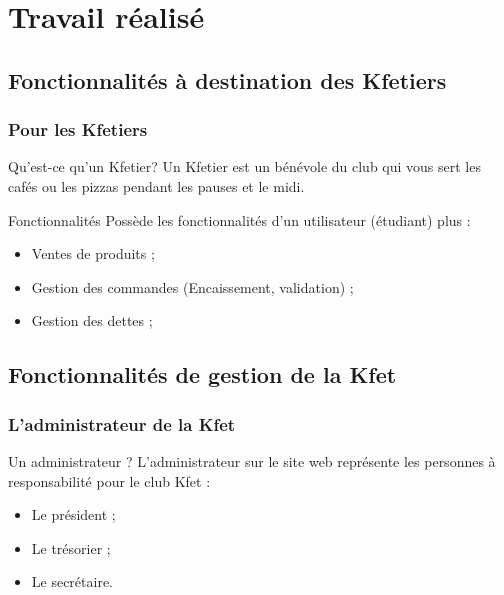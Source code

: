 \documentclass{polytech-presentation}
\newcommand{\beamerannot}[1]{
    \note{#1}
}
\begin{document}
        \section<presentation>{Travail réalisé}%

            \subsection<presentation>{Fonctionnalités à destination des Kfetiers}%
                \begin{frame}
		  \frametitle{Pour les Kfetiers}
		    \begin{block}{Qu'est-ce qu'un Kfetier?}
		     Un Kfetier est un bénévole du club qui vous sert les cafés ou les pizzas pendant les pauses et le
midi.
		    \end{block}

                    \begin{block}{Fonctionnalités}
                     Possède les fonctionnalités d'un utilisateur (étudiant) plus :
		      \begin{itemize}
		       \item Ventes de produits ;
		       \item Gestion des commandes (Encaissement, validation) ;
		       \item Gestion des dettes ;
		      \end{itemize}
                    \end{block}
                    \beamerannot{}
                \end{frame}

            \subsection<presentation>{Fonctionnalités de gestion de la Kfet}%
                \begin{frame}
		  \frametitle{L'administrateur de la Kfet}
                    \begin{block}{Un administrateur ?}
		      L'administrateur sur le site web représente les personnes à responsabilité pour le club Kfet :
		      \begin{itemize}
		       \item Le président ;
		       \item Le trésorier ;
		       \item Le secrétaire.
		      \end{itemize}
                    \end{block}
                    \beamerannot{}
                \end{frame}
                
\end{document}

